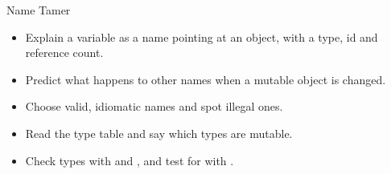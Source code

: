 \begin{achievement}{Name Tamer}
\begin{itemize}[itemsep=1pt]
\item Explain a variable as a name pointing at an object, with a type, id and reference count.
\item Predict what happens to other names when a mutable object is changed.
\item Choose valid, idiomatic names and spot illegal ones.
\item Read the type table and say which types are mutable.
\item Check types with  and , and test for  with .
\end{itemize}
\end{achievement}
